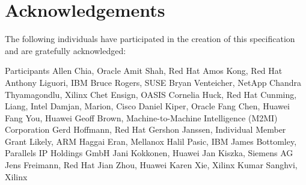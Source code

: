 \chapter{Acknowledgements}\label{chap:Acknowledgements}

The following individuals have participated in the creation of this specification and are gratefully acknowledged:

\begin{oasistitlesection}{Participants}
Allen Chia, Oracle	\newline
Amit Shah,	Red Hat	\newline
Amos Kong,	Red Hat	\newline
Anthony Liguori,	IBM	\newline
Bruce Rogers, SUSE	\newline
Bryan Venteicher,	NetApp	\newline
Chandra Thyamagondlu, Xilinx	\newline
Chet Ensign, OASIS	\newline
Cornelia Huck,	Red Hat	\newline
Cunming, Liang, Intel	\newline
Damjan, Marion, Cisco	\newline
Daniel Kiper,	Oracle	\newline
Fang Chen, Huawei	\newline
Fang You, Huawei	\newline
Geoff Brown,	Machine-to-Machine Intelligence (M2MI) Corporation	\newline
Gerd Hoffmann, Red Hat	\newline
Gershon Janssen,	Individual Member	\newline
Grant Likely, ARM	\newline
Haggai Eran,	Mellanox	\newline
Halil Pasic,	IBM	\newline
James Bottomley,	Parallels IP Holdings GmbH	\newline
Jani Kokkonen, Huawei	\newline
Jan Kiszka,	Siemens AG	\newline
Jens Freimann, Red Hat	\newline
Jian Zhou,	Huawei	\newline
Karen Xie, Xilinx	\newline
Kumar Sanghvi, Xilinx	\newline

\end{oasistitlesection}

